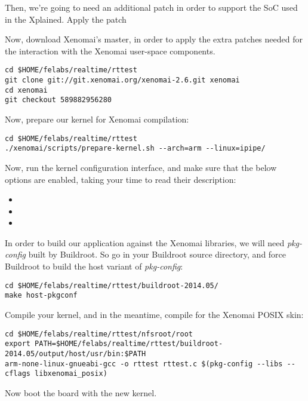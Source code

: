 Then, we're going to need an additional patch in order to support the
SoC used in the Xplained. Apply the patch

Now, download Xenomai's master, in order to apply the extra patches
needed for the interaction with the Xenomai user-space components.

\begin{verbatim}
cd $HOME/felabs/realtime/rttest
git clone git://git.xenomai.org/xenomai-2.6.git xenomai
cd xenomai
git checkout 589882956280
\end{verbatim}

Now, prepare our kernel for Xenomai compilation:
\begin{verbatim}
cd $HOME/felabs/realtime/rttest
./xenomai/scripts/prepare-kernel.sh --arch=arm --linux=ipipe/
\end{verbatim}

Now, run the kernel configuration interface, and make sure that
the below options are enabled, taking your time to read their
description:

\begin{itemize}
\item {}
\item {}
\item {}
\end{itemize}

In order to build our application against the Xenomai libraries, we
will need {\em pkg-config} built by Buildroot. So go in your Buildroot
source directory, and force Buildroot to build the host variant of
{\em pkg-config}:

\begin{verbatim}
cd $HOME/felabs/realtime/rttest/buildroot-2014.05/
make host-pkgconf
\end{verbatim}

Compile your kernel, and in the meantime,
compile  for the Xenomai POSIX skin:

\small
\begin{verbatim}
cd $HOME/felabs/realtime/rttest/nfsroot/root
export PATH=$HOME/felabs/realtime/rttest/buildroot-2014.05/output/host/usr/bin:$PATH
arm-none-linux-gnueabi-gcc -o rttest rttest.c $(pkg-config --libs --cflags libxenomai_posix)
\end{verbatim}
\normalsize

Now boot the board with the new kernel.

